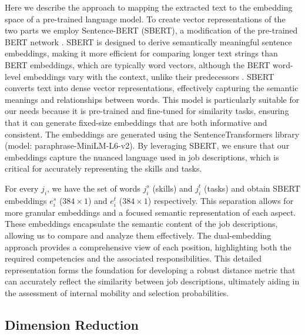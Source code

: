 Here we describe the approach to mapping the extracted text to the embedding space of a pre-trained language model. 
To create vector representations of the two parts we employ Sentence-BERT (SBERT), a modification of the pre-trained 
BERT network \citep{devlin2018bert}. SBERT is designed to derive semantically meaningful sentence embeddings, making 
it more efficient for comparing longer text strings than BERT embeddings, which are typically word vectors, although 
the BERT word-level embeddings vary with the context, unlike their predecessors \citep{reimers-2019-sentence-bert}. 
SBERT converts text into dense vector representations, effectively capturing the semantic meanings and relationships 
between words. This model is particularly suitable for our needs because it is pre-trained and fine-tuned for 
similarity tasks, ensuring that it can generate fixed-size embeddings that are both informative and consistent. 
The embeddings are generated using the SentenceTransformers library (model: paraphrase-MiniLM-L6-v2). By leveraging 
SBERT, we ensure that our embeddings capture the nuanced language used in job descriptions, which is critical for 
accurately representing the skills and tasks. 

For every $j_i$, we have the set of words $j_i^s$ (skills) and $j_i^t$ (tasks) and obtain SBERT embeddings 
$e_i^s$ ($384 \times 1$) and $e_i^t$ ($384 \times 1$) respectively. This separation allows for more granular 
embeddings and a focused semantic representation of each aspect. These embeddings encapsulate the semantic content 
of the job descriptions, allowing us to compare and analyze them effectively. The dual-embedding approach provides 
a comprehensive view of each position, highlighting both the required competencies and the associated responsibilities. 
This detailed representation forms the foundation for developing a robust distance metric that can accurately reflect 
the similarity between job descriptions, ultimately aiding in the assessment of internal mobility and selection probabilities.  

\subsection{Dimension Reduction}

